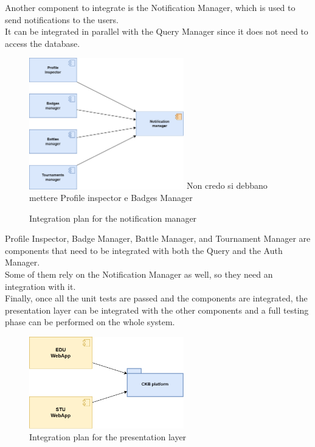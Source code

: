 Another component to integrate is the Notification Manager, which is used to send notifications to the users. \\
It can be integrated in parallel with the Query Manager since it does not need to access the database.\\
\begin{figure}[H]
    \centering
    \includegraphics[width=0.6\textwidth]{images/test_plan/test-plan-4.png}
    {\color{red} Non credo si debbano mettere Profile inspector e Badges Manager}
    \caption{Integration plan for the notification manager}
    \label{fig:test-plan-4}
\end{figure}

Profile Inspector, Badge Manager, Battle Manager, and Tournament Manager are components that need to be integrated with both the Query and the Auth Manager.\\
Some of them rely on the Notification Manager as well, so they need an integration with it.\\


Finally, once all the unit tests are passed and the components are integrated, the presentation layer can be integrated with the other components and a full testing phase can be performed on the whole system.\\
\begin{figure}[H]
    \centering
    \includegraphics[width=0.6\textwidth]{images/test_plan/test-plan-5.png}
    \caption{Integration plan for the presentation layer}
    \label{fig:test-plan-5}
\end{figure}

